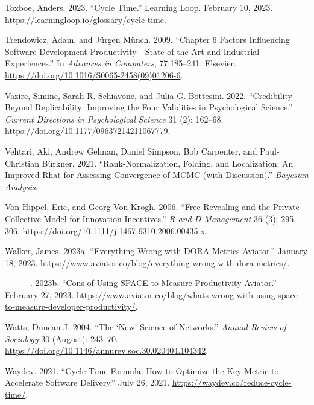 \documentclass[
]{article}
\newlength{\cslhangindent}
\newenvironment{CSLReferences}[2] %
 {\begin{list}{}{%
  \setlength{\itemindent}{0pt}
  \setlength{\leftmargin}{0pt}
  \setlength{\parsep}{0pt}
  \ifodd #1
   \setlength{\leftmargin}{\cslhangindent}
   \setlength{\itemindent}{-1\cslhangindent}
  \fi
  \setlength{\itemsep}{#2\baselineskip}}}
 {\end{list}}
\begin{document}
\begin{CSLReferences}{1}{0}
Toxboe, Anders. 2023. {``Cycle {Time}.''} Learning Loop. February 10,
2023. \url{https://learningloop.io/glossary/cycle-time}.

Trendowicz, Adam, and Jürgen Münch. 2009. {``Chapter 6 {Factors
Influencing Software Development Productivity}---{State}‐of‐the‐{Art}
and {Industrial Experiences}.''} In \emph{Advances in {Computers}},
77:185--241. Elsevier.
\url{https://doi.org/10.1016/S0065-2458(09)01206-6}.

Vazire, Simine, Sarah R. Schiavone, and Julia G. Bottesini. 2022.
{``Credibility {Beyond Replicability}: {Improving} the {Four Validities}
in {Psychological Science}.''} \emph{Current Directions in Psychological
Science} 31 (2): 162--68.
\url{https://doi.org/10.1177/09637214211067779}.

Vehtari, Aki, Andrew Gelman, Daniel Simpson, Bob Carpenter, and
Paul-Christian Bürkner. 2021. {``Rank-Normalization, Folding, and
Localization: {An} Improved {Rhat} for Assessing Convergence of {MCMC}
(with Discussion).''} \emph{Bayesian Analysis}.

Von Hippel, Eric, and Georg Von Krogh. 2006. {``Free Revealing and the
Private-Collective Model for Innovation Incentives.''} \emph{R and D
Management} 36 (3): 295--306.
\url{https://doi.org/10.1111/j.1467-9310.2006.00435.x}.

Walker, James. 2023a. {``Everything {Wrong} with {DORA Metrics}
\textbar{} {Aviator}.''} January 18, 2023.
\url{https://www.aviator.co/blog/everything-wrong-with-dora-metrics/}.

---------. 2023b. {``Cons of {Using SPACE} to {Measure Productivity}
\textbar{} {Aviator}.''} February 27, 2023.
\url{https://www.aviator.co/blog/whats-wrong-with-using-space-to-measure-developer-productivity/}.

Watts, Duncan J. 2004. {``The {`{New}'} {Science} of {Networks}.''}
\emph{Annual Review of Sociology} 30 (August): 243--70.
\url{https://doi.org/10.1146/annurev.soc.30.020404.104342}.

Waydev. 2021. {``Cycle {Time Formula}: {How} to {Optimize} the {Key
Metric} to {Accelerate Software Delivery}.''} July 26, 2021.
\url{https://waydev.co/reduce-cycle-time/}.


\end{CSLReferences}
\end{document}
